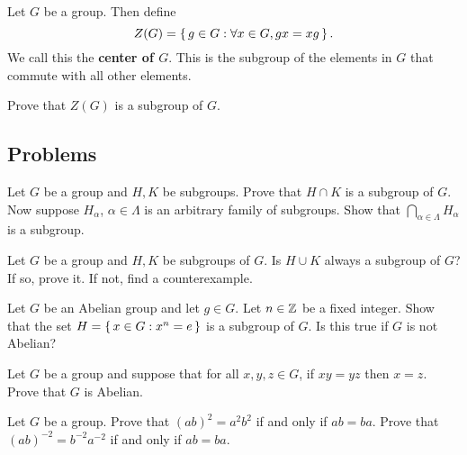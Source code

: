 \documentclass[./main.tex]{subfiles}
\begin{document}
\begin{definition}
    Let $G$ be a group. Then define 
    \[
        Z(G) = \set{g \in G: \forall x \in G, gx = xg}.
    \]
    We call this the \textbf{center of $G$}. This is the subgroup of the
    elements in $G$ that commute with all other elements.
\end{definition}
\begin{exercise}
    Prove that $Z(G)$ is a subgroup of $G$.
\end{exercise}




\subsection{Problems}

\begin{exercise}
    Let $G$ be a group and $H, K$ be subgroups. Prove that $H \cap K$ is a
    subgroup of $G$. Now suppose $H_{\alpha}$, $\alpha \in \Lambda$ is an
    arbitrary family of subgroups. Show that $\bigcap_{\alpha \in \Lambda}
    H_\alpha$ is a subgroup.
\end{exercise}

\begin{exercise}
    Let $G$ be a group and $H, K$ be subgroups of $G$. Is $H \cup K$ always a
    subgroup of $G$? If so, prove it. If not, find a counterexample.
\end{exercise}

\begin{exercise}
    Let $G$ be an Abelian group and let $g \in G$. Let $n \in \mathbb{Z}$ be a fixed
    integer. Show that the set $H = \set{x \in G: x^n = e}$ is a subgroup of
    $G$. Is this true if $G$ is not Abelian?
\end{exercise}

\begin{exercise}
    Let $G$ be a group and suppose that for all $x,y,z \in G$, if $xy=yz$ then
    $x=z$. Prove that $G$ is Abelian.
\end{exercise}

\begin{exercise}
    Let $G$ be a group. Prove that $(ab)^2 = a^2 b^2$ if and only if $ab=ba$.
    Prove that $(ab)^{-2} = b^{-2} a^{-2}$ if and only if $ab=ba$.
    \autocite[Ex.~36, Ch~1, \pno~56]{Gallian_2020}
\end{exercise}
\end{document}
